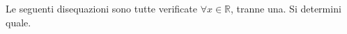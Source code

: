 Le seguenti disequazioni sono tutte verificate $\forall x \in \mathbb {R}$, tranne una. 
Si determini quale.